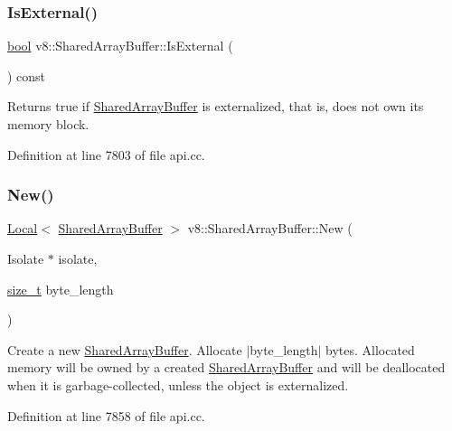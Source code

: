 \subsubsection{\texorpdfstring{Is\+External()}{IsExternal()}}
{\footnotesize\ttfamily \mbox{\hyperlink{classbool}{bool}} v8\+::\+Shared\+Array\+Buffer\+::\+Is\+External (\begin{DoxyParamCaption}{ }\end{DoxyParamCaption}) const}

Returns true if \mbox{\hyperlink{classv8_1_1SharedArrayBuffer}{Shared\+Array\+Buffer}} is externalized, that is, does not own its memory block. 

Definition at line 7803 of file api.\+cc.

\mbox{\label{classv8_1_1SharedArrayBuffer_a3162c3d636c0c184db7001086f68a79a}} 
\subsubsection{\texorpdfstring{New()}{New()}\hspace{0.1cm}{\footnotesize\ttfamily [1/2]}}
{\footnotesize\ttfamily \mbox{\hyperlink{classv8_1_1Local}{Local}}$<$ \mbox{\hyperlink{classv8_1_1SharedArrayBuffer}{Shared\+Array\+Buffer}} $>$ v8\+::\+Shared\+Array\+Buffer\+::\+New (\begin{DoxyParamCaption}\item[{Isolate $\ast$}]{isolate,  }\item[{\mbox{\hyperlink{classsize__t}{size\+\_\+t}}}]{byte\+\_\+length }\end{DoxyParamCaption})\hspace{0.3cm}{\ttfamily [static]}}

Create a new \mbox{\hyperlink{classv8_1_1SharedArrayBuffer}{Shared\+Array\+Buffer}}. Allocate $\vert$byte\+\_\+length$\vert$ bytes. Allocated memory will be owned by a created \mbox{\hyperlink{classv8_1_1SharedArrayBuffer}{Shared\+Array\+Buffer}} and will be deallocated when it is garbage-\/collected, unless the object is externalized. 

Definition at line 7858 of file api.\+cc.

\mbox{\label{classv8_1_1SharedArrayBuffer_ada351f205ccc0cb9616df676beda7d17}} 
